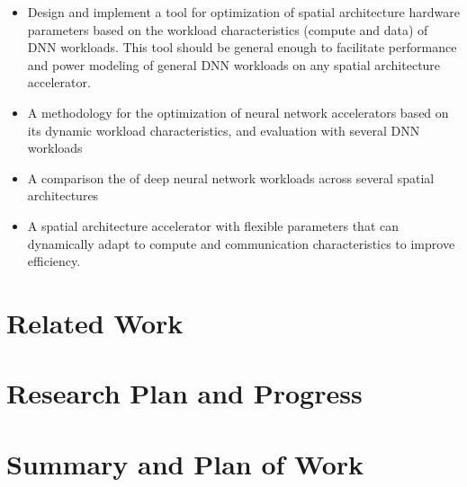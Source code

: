\begin{itemize}
    \item Design and implement a tool for optimization of spatial architecture hardware parameters based on the workload characteristics (compute and data) of DNN workloads. 
    This tool should be general enough to facilitate performance and power modeling of general DNN workloads on any spatial architecture accelerator.
    \item A methodology for the optimization of neural network accelerators based on its dynamic workload characteristics, and evaluation with several DNN workloads
    \item A comparison the of deep neural network workloads across several spatial architectures
    \item A spatial architecture accelerator with flexible parameters that can dynamically adapt to compute and communication characteristics to improve efficiency.
\end{itemize}




\section{Related Work}
\section{Research Plan and Progress}
\section{Summary and Plan of Work}

